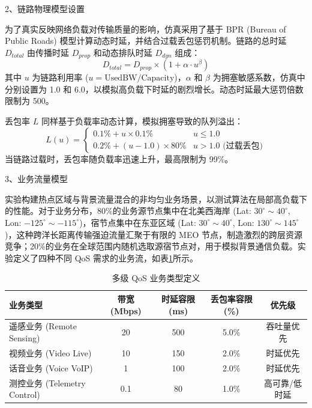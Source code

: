     
    2、链路物理模型设置
    
    为了真实反映网络负载对传输质量的影响，仿真采用了基于 BPR (Bureau of Public Roads) 模型计算动态时延，并结合过载丢包惩罚机制。链路的总时延 $D_{total}$ 由传播时延 $D_{prop}$ 和动态排队时延 $D_{dyn}$ 组成：
    $$ D_{total} = D_{prop} \times (1 + \alpha \cdot u^\beta) $$
    其中 $u$ 为链路利用率 ($u = \text{UsedBW} / \text{Capacity}$)，$\alpha$ 和 $\beta$ 为拥塞敏感系数，仿真中分别设置为 1.0 和 6.0，以模拟高负载下时延的剧烈增长。动态时延最大惩罚倍数限制为 500。
    
    丢包率 $L$ 同样基于负载率动态计算，模拟拥塞导致的队列溢出：
    $$
    L(u) =
    \begin{cases}
      0.1\% + u \times 0.1\% & u \le 1.0 \\
      0.2\% + (u-1.0) \times 80\% & u > 1.0 \text{ (过载丢包)}
    \end{cases}
    $$
    当链路过载时，丢包率随负载率迅速上升，最高限制为 99\%。
    
    3、业务流量模型
    
    实验构建热点区域与背景流量混合的非均匀业务场景，以测试算法在局部高负载下的性能。对于业务分布，80\%的业务源节点集中在北美西海岸 (Lat: $30^{\circ}\sim40^{\circ}$, Lon: $-125^{\circ}\sim-115^{\circ}$)，宿节点集中在东亚区域 (Lat: $30^{\circ}\sim40^{\circ}$, Lon: $130^{\circ}\sim145^{\circ}$)，这种跨洋长距离传输强迫流量汇聚于有限的 MEO 节点，制造激烈的跨层资源竞争；20\%的业务在全球范围内随机选取源宿节点对，用于模拟背景通信负载。实验定义了四种不同 QoS 需求的业务流，如表\ref{tab: 多级 QoS 业务类型定义}所示。
    \begin{table}[htbp]
      \caption{多级 QoS 业务类型定义}
      \centering
      \begin{tabular}{lcccc}
        \toprule
        \textbf{业务类型} & \textbf{带宽 (Mbps)} & \textbf{时延容限 (ms)} & \textbf{丢包率容限 (\%)} & \textbf{优先级}  \\
        \midrule
        遥感业务 (Remote Sensing) & 20  & 500 & 5.0\% & 吞吐量优先 \\
        视频业务 (Video Live) & 10  & 150 &  2.0\% & 时延优先 \\
        话音业务 (Voice VoIP) & 1   & 100 & 2.0\% & 时延优先 \\
        测控业务 (Telemetry Control) & 0.1 & 80 & 1.0\% & 高可靠/低时延 \\
        \bottomrule
      \end{tabular}
      \label{tab: 多级 QoS 业务类型定义}
    \end{table}
    
